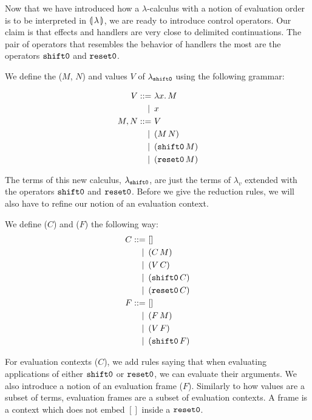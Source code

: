 Now that we have introduced how a $\lambda$-calculus with a notion of
evaluation order is to be interpreted in $\llparenthesis \, \lambda \, \rrparenthesis$, we are ready
to introduce control operators. Our claim is that effects and handlers are
very close to delimited continuations. The pair of operators that resembles
the behavior of handlers the most are the operators $\mathtt{shift0}$ and
$\mathtt{reset0}$.

\begin{definition}
  We define the  ($M$, $N$) and values $V$ of
  $\lambda_{\mathtt{shift0}}$ using the following grammar:

\begin{align*}
  V ::= &\ \lambda x.\, M \\
   | \, &\ x \\
  M, N ::= &\ V \\
   | \, &\ (M\,N) \\
   | \, &\ (\mathtt{shift0}\,M) \\
   | \, &\ (\mathtt{reset0}\,M)
\end{align*}
\end{definition}

The terms of this new calculus, $\lambda_{\mathtt{shift0}}$, are just the terms of
$\lambda_v$ extended with the operators $\mathtt{shift0}$ and $\mathtt{reset0}$. Before we
give the reduction rules, we will also have to refine our notion of an
evaluation context.

\begin{definition}
  We define  ($C$) and 
  ($F$) the following way:
\begin{align*}
  C ::= &\ [] \\
   | \, &\ (C\,M) \\
   | \, &\ (V\,C) \\
   | \, &\ (\mathtt{shift0}\,C) \\
   | \, &\ (\mathtt{reset0}\,C) \\
  F ::= &\ [] \\
   | \, &\ (F\,M) \\
   | \, &\ (V\,F) \\
   | \, &\ (\mathtt{shift0}\,F)
\end{align*}
\end{definition}

For evaluation contexts ($C$), we add rules saying that when evaluating
applications of either $\mathtt{shift0}$ or $\mathtt{reset0}$, we can evaluate their
arguments. We also introduce a notion of an evaluation frame
($F$). Similarly to how values are a subset of terms, evaluation frames are
a subset of evaluation contexts. A frame is a context which does not embed
$[]$ inside a $\mathtt{reset0}$.

